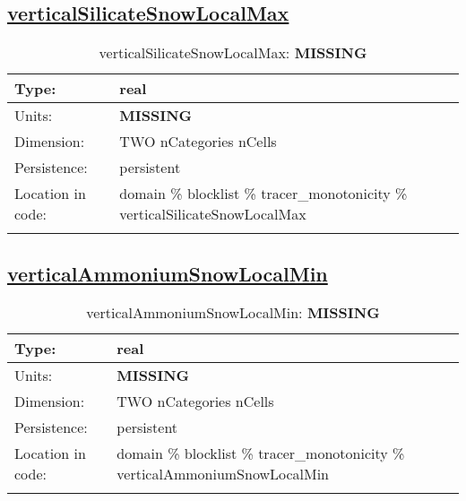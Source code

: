 \subsection[verticalSilicateSnowLocalMax]{\hyperref[sec:var_tab_tracer_monotonicity]{verticalSilicateSnowLocalMax}}
\label{subsec:var_sec_tracer_monotonicity_verticalSilicateSnowLocalMax}
\begin{center}
\begin{longtable}{| p{2.0in} | p{4.0in} |}
        \hline 
        Type: & real \\
        \hline 
        Units: & {\bf \color{red} MISSING} \\
        \hline 
        Dimension: & TWO nCategories nCells \\
        \hline 
        Persistence: & persistent \\
        \hline 
         Location in code: & domain \% blocklist \% tracer\_monotonicity \% verticalSilicateSnowLocalMax \\
         \hline 
    \caption{verticalSilicateSnowLocalMax: {\bf \color{red} MISSING}}
\end{longtable}
\end{center}
\subsection[verticalAmmoniumSnowLocalMin]{\hyperref[sec:var_tab_tracer_monotonicity]{verticalAmmoniumSnowLocalMin}}
\label{subsec:var_sec_tracer_monotonicity_verticalAmmoniumSnowLocalMin}
\begin{center}
\begin{longtable}{| p{2.0in} | p{4.0in} |}
        \hline 
        Type: & real \\
        \hline 
        Units: & {\bf \color{red} MISSING} \\
        \hline 
        Dimension: & TWO nCategories nCells \\
        \hline 
        Persistence: & persistent \\
        \hline 
         Location in code: & domain \% blocklist \% tracer\_monotonicity \% verticalAmmoniumSnowLocalMin \\
         \hline 
    \caption{verticalAmmoniumSnowLocalMin: {\bf \color{red} MISSING}}
\end{longtable}
\end{center}
